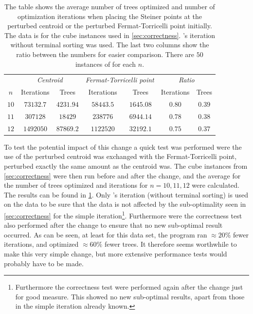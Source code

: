 \begin{table}[htbp]
  \centering
  \begin{tabular}{ccccccc}
    \toprule
         & \multicolumn{2}{c}{\footnotesize{\textit{Centroid}}}
         & \multicolumn{2}{c}{\footnotesize{\textit{Fermat-Torricelli point}}}
         & \multicolumn{2}{c}{\footnotesize{\textit{Ratio}}}                     \\
    $n$  & Iterations & Trees     & Iterations & Trees     & Iterations & Trees  \\
    \cmidrule(r){1-1}\cmidrule(lr){2-3}\cmidrule(lr){4-5}\cmidrule(l){6-7}
    $10$ & $73132.7$  & $4231.94$ & $58443.5$  & $1645.08$ & $0.80$     & $0.39$ \\ 
    $11$ & $307128$   & $18429$   & $238776$   & $6944.14$ & $0.78$     & $0.38$ \\
    $12$ & $1492050$  & $87869.2$ & $1122520$  & $32192.1$ & $0.75$     & $0.37$ \\
    \bottomrule
  \end{tabular}
  \caption[Perturbed centroid vs.\ perturbed Fermat-Torricelli point]{The table shows the average number of trees optimized and
    number of optimization iterations when placing the Steiner points at the perturbed
    centroid or the perturbed Fermat-Torricelli point initially. The data is for
    the cube instances used in \cref{sec:correctness}. \citeauthor{smith1992}'s iteration without terminal sorting was used. The last two columns
    show the ratio between the numbers for easier comparison. There are $50$
    instances of for each $n$.\label{tab:centroid-vs-fermat}}
\end{table}

To test the potential impact of this change a quick test was performed were the
use of the perturbed centroid was exchanged with the Fermat-Torricelli point,
perturbed exactly the same amount as the centroid was. The cube instances from
\cref{sec:correctness} were then run before and after the change, and the
average for the number of trees optimized and iterations for $n=10,11,12$ were
calculated. The results can be found in \cref{tab:centroid-vs-fermat}. Only
\citeauthor{smith1992}'s iteration (without terminal sorting) is used on the
data to be sure that the data is not affected by the sub-optimality seen in
\cref{sec:correctness} for the simple iteration\footnote{Furthermore the
  correctness test were performed again after the change just for good measure.
  This showed no new sub-optimal results, apart from those in the simple
  iteration already known.}. Furthermore were the correctness test also
performed after the change to ensure that no new sub-optimal result occurred. As
can be seen, at least for this data set, the program ran $\approx 20\%$ fewer
iterations, and optimized $\approx 60\%$ fewer trees. It therefore seems
worthwhile to make this very simple change, but more extensive performance tests
would probably have to be made.

